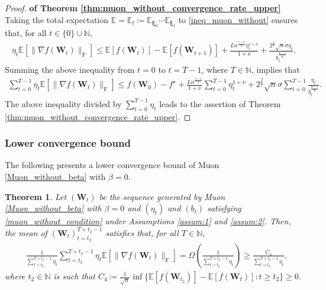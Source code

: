 \documentclass[twoside,11pt]{article}
\newtheorem{thm}{Theorem}[section]
\begin{document}
\begin{proof}
\textbf{of Theorem \ref{thm:muon_without_convergence_rate_upper}} Taking the total expectation $\mathbb{E} = \mathbb{E}_t \coloneqq \mathbb{E}_{\bm{\xi}_0} \cdots \mathbb{E}_{\bm{\xi}_t}$ to \eqref{ineq_muon_without} ensures that, for all $t \in \{ 0\} \cup \mathbb{N}$,
\begin{align*}
\eta_t 
\mathbb{E} [\| \nabla f (\bm{W}_t) \|_{\mathrm{F}}]
\leq 
\mathbb{E} [ f(\bm{W}_{t})]
-
\mathbb{E} [ f(\bm{W}_{t+1})]
+
\frac{L n^{\frac{1 + \nu}{2}} \eta_t^{1 + \nu}}{1 + \nu}
+
\frac{2^{\frac{2}{\mathfrak{p}}} \sqrt{n} \sigma \eta_t}{b_t^{\frac{\mathfrak{p} -1}{\mathfrak{p}}}}.
\end{align*}
Summing the above inequality from $t = 0$ to $t = T-1$, where $T \in \mathbb{N}$, implies that
\begin{align*}
\sum_{t=0}^{T-1} \eta_t 
\mathbb{E} [\| \nabla f (\bm{W}_t) \|_{\mathrm{F}}]
\leq 
f(\bm{W}_{0}) - f^\star
+
\frac{L n^{\frac{1 + \nu}{2}}}{1 + \nu}
\sum_{t=0}^{T-1} \eta_t^{1 + \nu}
+
2^{\frac{2}{\mathfrak{p}}} \sqrt{n} \sigma
\sum_{t=0}^{T-1}
\frac{\eta_t}{b_t^{\frac{\mathfrak{p} -1}{\mathfrak{p}}}}.
\end{align*}
The above inequality divided by $\sum_{t=0}^{T-1} \eta_t$ leads to the assertion of Theorem \ref{thm:muon_without_convergence_rate_upper}.
\end{proof}

\subsubsection{Lower convergence bound}
The following presents a lower convergence bound of Muon \eqref{Muon_without_beta} with $\beta = 0$.

\begin{thm}\label{thm:muon_without_convergence_rate_lower}
Let $(\bm{W}_t)$ be the sequence generated by Muon \eqref{Muon_without_beta} with $\beta = 0$ and $(\eta_t)$ and $(b_t)$ satisfying \eqref{muon_without_condition} under Assumptions \ref{assum:1} and \ref{assum:2}. Then, the mean of $(\bm{W}_t)_{t = t_2}^{T + t_2 -1}$ satisfies that, for all $T \in \mathbb{N}$,
\begin{align*}
&\frac{1}{\sum_{t= t_2}^{T + t_2 -1} \eta_t}
\sum_{t= t_2}^{T + t_2 -1} \eta_t 
\mathbb{E} [\| \nabla f (\bm{W}_t)\|_{\mathrm{F}}]
= \Omega \left( \frac{1}{\sum_{t= t_2}^{T + t_2 -1} \eta_t} \right) 
\geq \frac{C_4}{\sum_{t = t_2}^{T + t_2 -1} \eta_t},
\end{align*}
where $t_2 \in \mathbb{N}$ is such that $C_4 \coloneqq \frac{1}{\sqrt{n}} \inf \{\mathbb{E}[f(\bm{W}_{t_2})] - \mathbb{E}[f(\bm{W}_t)] \colon t \geq t_2 \} \geq 0$.
\end{thm}
\end{document}
